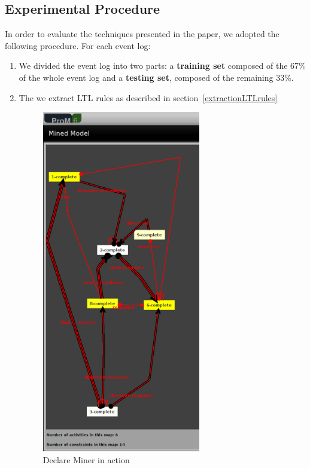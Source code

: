 \subsection{Experimental Procedure}
\label{ssec:procedure}



In order to evaluate the techniques presented in the paper, we adopted the following procedure. For each event log:
\begin{enumerate}
\item We divided the event log into two parts: a \textbf{training set} composed of the 67\% of the whole event log and a \textbf{testing set}, composed of the remaining 33\%.
\item The we extract LTL rules as described in section~\ref{extractionLTLrules}

\begin{figure}[!ht]
	\begin{center}  
		\includegraphics[height=15cm]{3_ltl_prom.png}
		\caption{Declare Miner in action}
		\label{figure:ltl}
	\end{center}
\end{figure}



\end{enumerate}
